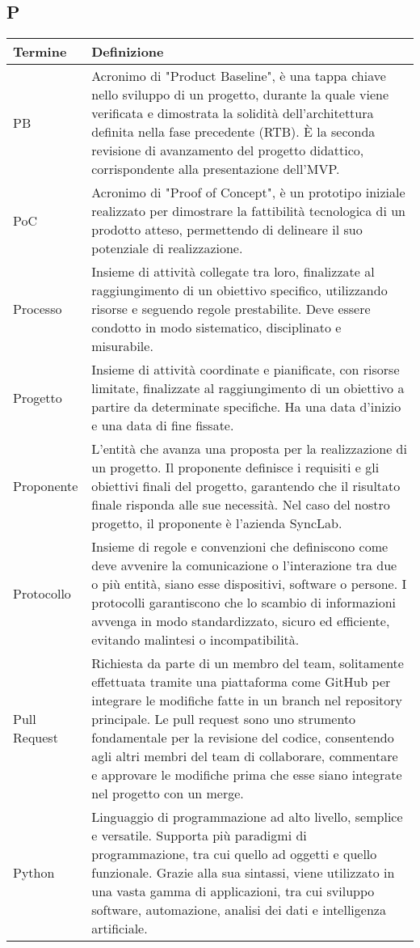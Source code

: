 \documentclass[10pt]{article}
\begin{document}
\subsection{P} %
\begin{longtable}{|>{\centering\arraybackslash}m{2.5cm}|>{\arraybackslash}m{12.5cm}|}
\hline
\rowcolor[gray]{0.8}
\textbf{Termine} & \textbf{Definizione}\\
\endhead
\hline
PB & Acronimo di "Product Baseline", è una tappa chiave nello sviluppo di un progetto, durante la quale viene verificata e dimostrata la solidità dell’architettura definita nella fase precedente (RTB). È la seconda revisione di avanzamento del progetto didattico, corrispondente alla presentazione dell'MVP.\\
\hline
PoC & Acronimo di "Proof of Concept", è un prototipo iniziale realizzato per dimostrare la fattibilità tecnologica di un prodotto atteso, permettendo di delineare il suo potenziale di realizzazione.\\
\hline
Processo & Insieme di attività collegate tra loro, finalizzate al raggiungimento di un obiettivo specifico, utilizzando risorse e seguendo regole prestabilite. Deve essere condotto in modo sistematico, disciplinato e misurabile.\\
\hline
Progetto & Insieme di attività coordinate e pianificate, con risorse limitate, finalizzate al raggiungimento di un obiettivo a partire da determinate specifiche. Ha una data d'inizio e una data di fine fissate.\\
\hline
Proponente & L'entità che avanza una proposta per la realizzazione di un progetto. Il proponente definisce i requisiti e gli obiettivi finali del progetto, garantendo che il risultato finale risponda alle sue necessità. Nel caso del nostro progetto, il proponente è l'azienda SyncLab.\\
\hline
Protocollo & Insieme di regole e convenzioni che definiscono come deve avvenire la comunicazione o l'interazione tra due o più entità, siano esse dispositivi, software o persone. I protocolli garantiscono che lo scambio di informazioni avvenga in modo standardizzato, sicuro ed efficiente, evitando malintesi o incompatibilità.\\
\hline
Pull Request & Richiesta da parte di un membro del team, solitamente effettuata tramite una piattaforma come GitHub per integrare le modifiche fatte in un branch nel repository principale. Le pull request sono uno strumento fondamentale per la revisione del codice, consentendo agli altri membri del team di collaborare, commentare e approvare le modifiche prima che esse siano integrate nel progetto con un merge.\\
\hline
Python & Linguaggio di programmazione ad alto livello, semplice e versatile. Supporta più paradigmi di programmazione, tra cui quello ad oggetti e quello funzionale. Grazie alla sua sintassi, viene utilizzato in una vasta gamma di applicazioni, tra cui sviluppo software, automazione, analisi dei dati e intelligenza artificiale.\\
\hline
\end{longtable}
\end{document}

